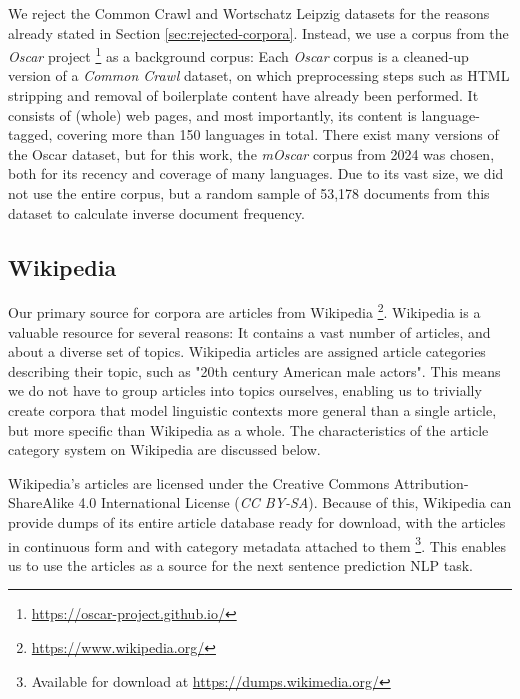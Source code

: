 We reject the Common Crawl and Wortschatz Leipzig datasets for the reasons already stated in Section \ref{sec:rejected-corpora}.
Instead, we use a corpus from the \textit{Oscar} project \footnote{\url{https://oscar-project.github.io/}} as a background corpus:
Each \textit{Oscar} corpus is a cleaned-up version of a \textit{Common Crawl} dataset, on which preprocessing steps such as HTML stripping and removal of boilerplate content have already been performed.
It consists of (whole) web pages, and most importantly, its content is language-tagged, covering more than 150 languages in total.
There exist many versions of the Oscar dataset, but for this work, the \textit{mOscar} \cite{futeralMOSCARLargescaleMultilingual2024} corpus from 2024 was chosen, both for its recency and coverage of many languages.
Due to its vast size, we did not use the entire corpus, but a random sample of 53,178 documents from this dataset to calculate inverse document frequency.

\subsection{Wikipedia} \label{sec:wikipedia}
Our primary source for corpora are articles from Wikipedia \footnote{\url{https://www.wikipedia.org/}}.
Wikipedia is a valuable resource for several reasons:
It contains a vast number of articles, and about a diverse set of topics.
Wikipedia articles are assigned article categories describing their topic, such as "20th century American male actors".
This means we do not have to group articles into topics ourselves, enabling us to trivially create corpora that model linguistic contexts more general than a single article, but more specific than Wikipedia as a whole.
The characteristics of the article category system on Wikipedia are discussed below.

Wikipedia's articles are licensed under the Creative Commons Attribution-ShareAlike 4.0 International License (\textit{CC BY-SA}).
Because of this, Wikipedia can provide dumps of its entire article database ready for download, with the articles in continuous form and with category metadata attached to them \footnote{Available for download at \url{https://dumps.wikimedia.org/}}.
This enables us to use the articles as a source for the next sentence prediction NLP task.

